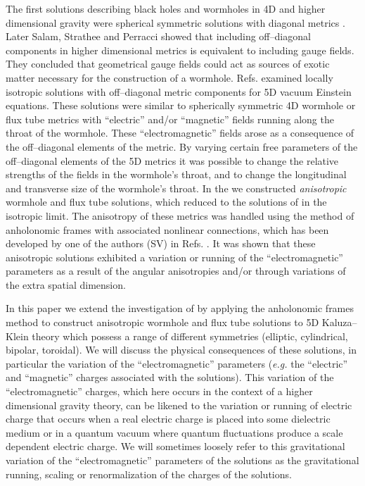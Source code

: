 \documentclass[a4paper,preprint,prabib,aps]{revtex4}
\begin{document}
The first solutions describing black holes and wormholes in 4D and higher
dimensional gravity were spherical symmetric solutions with diagonal metrics
\cite{mor}. Later Salam, Strathee and Perracci \cite{sal} showed that
including off--diagonal components in higher dimensional metrics is
equivalent to including gauge fields. They concluded that geometrical gauge
fields could act as sources of exotic matter necessary for the construction
of a wormhole. Refs. \cite{chodos,dzhsin} examined locally isotropic
solutions with off--diagonal metric components for 5D vacuum Einstein
equations. These solutions were similar to spherically symmetric 4D wormhole
or flux tube metrics with ``electric'' and/or ``magnetic'' fields running
along the throat of the wormhole. These ``electromagnetic'' fields arose as
a consequence of the off--diagonal elements of the metric. By varying
certain free parameters of the off--diagonal elements of the 5D metrics it
was possible to change the relative strengths of the fields in the
wormhole's throat, and to change the longitudinal and transverse size of the
wormhole's throat. In \cite{vsbd} the we constructed {\it anisotropic}
wormhole and flux tube solutions, which reduced to the solutions of \cite
{chodos,dzhsin} in the isotropic limit. The anisotropy of these metrics was
handled using the method of anholonomic frames with associated nonlinear
connections, which has been developed by one of the authors (SV) in Refs.
\cite{vst}. It was shown that these anisotropic solutions exhibited a
variation or running of the ``electromagnetic'' parameters as a result of the
angular anisotropies and/or through variations of the extra spatial
dimension.

In this paper we extend the investigation of \cite{vsbd} by applying the
anholonomic frames method to construct anisotropic wormhole and flux tube
solutions to 5D Kaluza--Klein theory which possess a range of different
symmetries (elliptic, cylindrical, bipolar, toroidal). We will discuss the
physical consequences of these solutions, in particular the variation
of the ``electromagnetic'' parameters ({\it e.g.} the ``electric''
and ``magnetic'' charges associated with the solutions). This variation
of the ``electromagnetic'' charges, which here occurs in the context
of a higher dimensional gravity theory, can be likened to the variation or
running of electric charge that occurs when a real electric charge is
placed into some dielectric medium or in a quantum vacuum where quantum
fluctuations produce a scale dependent electric charge. We will
sometimes loosely refer to this gravitational variation of the
``electromagnetic'' parameters of the solutions as the gravitational
running, scaling or renormalization of the charges of the solutions.
\end{document}
